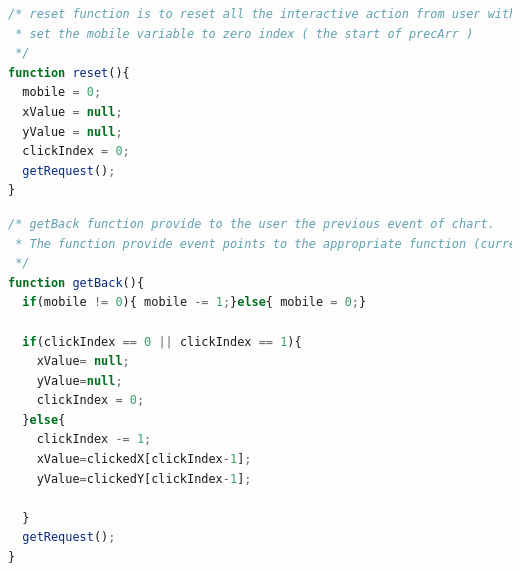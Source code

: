 \documentclass[11pt]{article}
\begin{document}
\begin{lstlisting}[label={lst:reset}, language=Javascript, caption={reset function is to reset all the interactive action from user with chart, and get back to the first stage},]
/* reset function is to reset all the interactive action from user with chart.
 * set the mobile variable to zero index ( the start of precArr )
 */
function reset(){
  mobile = 0;
  xValue = null;
  yValue = null;
  clickIndex = 0;
  getRequest();
}
\end{lstlisting}

\begin{lstlisting}[label={lst:getBack}, language=Javascript, caption={getBack function provide to the user the previous stage of chart},]
/* getBack function provide to the user the previous event of chart. 
 * The function provide event points to the appropriate function (current )
 */
function getBack(){
  if(mobile != 0){ mobile -= 1;}else{ mobile = 0;}

  if(clickIndex == 0 || clickIndex == 1){
    xValue= null;
    yValue=null;
    clickIndex = 0;
  }else{
    clickIndex -= 1;
    xValue=clickedX[clickIndex-1]; 
    yValue=clickedY[clickIndex-1];
    
  }
  getRequest();
}
\end{lstlisting}
\end{document}
